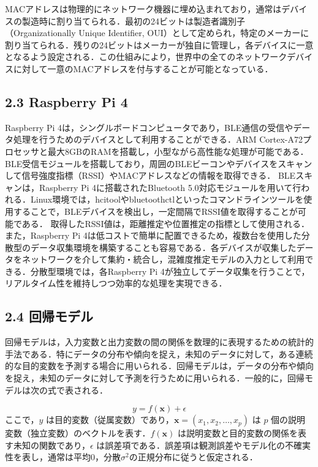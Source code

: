 MACアドレスは物理的にネットワーク機器に埋め込まれており，通常はデバイスの製造時に割り当てられる．最初の24ビットは製造者識別子（Organizationally Unique Identifier, OUI）として定められ，特定のメーカーに割り当てられる．残りの24ビットはメーカーが独自に管理し，各デバイスに一意となるよう設定される．この仕組みにより，世界中の全てのネットワークデバイスに対して一意のMACアドレスを付与することが可能となっている．

\subsection*{2.3 Raspberry Pi 4}
Raspberry Pi 4は，シングルボードコンピュータであり，BLE通信の受信やデータ処理を行うためのデバイスとして利用することができる\cite{rasPi}．ARM Cortex-A72プロセッサと最大8GBのRAMを搭載し，小型ながら高性能な処理が可能である\cite{rasPi}．BLE受信モジュールを搭載しており，周囲のBLEビーコンやデバイスをスキャンして信号強度指標（RSSI）やMACアドレスなどの情報を取得できる\cite{rasPi}．
BLEスキャンは，Raspberry Pi 4に搭載されたBluetooth 5.0対応モジュールを用いて行われる．Linux環境では，hcitoolやbluetoothctlといったコマンドラインツールを使用することで，BLEデバイスを検出し，一定間隔でRSSI値を取得することが可能である．
取得したRSSI値は，距離推定や位置推定の指標として使用される．
また，Raspberry Pi 4は低コストで簡単に配置できるため，複数台を使用した分散型のデータ収集環境を構築することも容易である．各デバイスが収集したデータをネットワークを介して集約・統合し，混雑度推定モデルの入力として利用できる．分散型環境では，各Raspberry Pi 4が独立してデータ収集を行うことで，リアルタイム性を維持しつつ効率的な処理を実現できる．

\subsection*{2.4 回帰モデル}
回帰モデルは，入力変数と出力変数の間の関係を数理的に表現するための統計的手法である\cite{prml}．特にデータの分布や傾向を捉え，未知のデータに対して，ある連続的な目的変数を予測する場合に用いられる．回帰モデルは，データの分布や傾向を捉え，未知のデータに対して予測を行うために用いられる．一般的に，回帰モデルは次の式で表される．

\begin{equation}
	y = f(\mathbf{x}) + \epsilon
\end{equation}
ここで，$y$ は目的変数（従属変数）であり，$\mathbf{x} = (x_1, x_2, \ldots, x_p)$ は $p$ 個の説明変数（独立変数）のベクトルを表す．$f(\mathbf{x})$ は説明変数と目的変数の関係を表す未知の関数であり，$\epsilon$ は誤差項である．誤差項は観測誤差やモデル化の不確実性を表し，通常は平均0，分散$\sigma^2$の正規分布に従うと仮定される．

